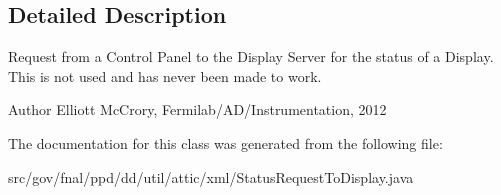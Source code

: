 \subsection{Detailed Description}
Request from a Control Panel to the Display Server for the status of a Display. This is not used and has never been made to work.

\begin{DoxyAuthor}{Author}
Elliott Mc\-Crory, Fermilab/\-A\-D/\-Instrumentation, 2012 
\end{DoxyAuthor}


The documentation for this class was generated from the following file\-:\begin{DoxyCompactItemize}
\item 
src/gov/fnal/ppd/dd/util/attic/xml/Status\-Request\-To\-Display.\-java\end{DoxyCompactItemize}
